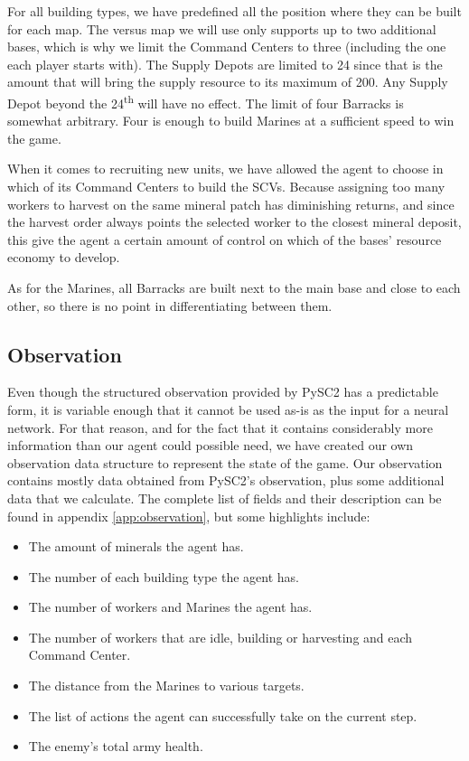 For all building types, we have predefined all the position where they can be built for each map. The versus map we will use only supports up to two additional bases, which is why we limit the Command Centers to three (including the one each player starts with). The Supply Depots are limited to 24 since that is the amount that will bring the supply resource to its maximum of 200. Any Supply Depot beyond the 24\textsuperscript{th} will have no effect. The limit of four Barracks is somewhat arbitrary. Four is enough to build Marines at a sufficient speed to win the game.

When it comes to recruiting new units, we have allowed the agent to choose in which of its Command Centers to build the SCVs. Because assigning too many workers to harvest on the same mineral patch has diminishing returns, and since the harvest order always points the selected worker to the closest mineral deposit, this give the agent a certain amount of control on which of the bases' resource economy to develop.

As for the Marines, all Barracks are built next to the main base and close to each other, so there is no point in differentiating between them.

\subsection{Observation}

Even though the structured observation provided by PySC2 has a predictable form, it is variable enough that it cannot be used as-is as the input for a neural network. For that reason, and for the fact that it contains considerably more information than our agent could possible need, we have created our own observation data structure to represent the state of the game. Our observation contains mostly data obtained from PySC2's observation, plus some additional data that we calculate. The complete list of fields and their description can be found in appendix \ref{app:observation}, but some highlights include:

\begin{itemize}
    \item The amount of minerals the agent has.
    \item The number of each building type the agent has.
    \item The number of workers and Marines the agent has.
    \item The number of workers that are idle, building or harvesting and each Command Center.
    \item The distance from the Marines to various targets.
    \item The list of actions the agent can successfully take on the current step.
    \item The enemy's total army health.
\end{itemize}

